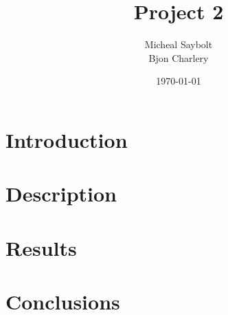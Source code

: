 \documentclass[12pt]{article}
\begin{document}
	\title{Project 2}
	\author{Micheal Saybolt \\ Bjon Charlery}
	
	\date{\today}
	\maketitle
	\pagebreak
	\begin{abstract}
		
	\end{abstract}
	\bigskip
	\bigskip
	\section{Introduction}
	
	\bigskip
	\bigskip
	\section{Description}
	
	\bigskip
	\bigskip
	\section{Results}
	
	\bigskip
	\bigskip
	\section{Conclusions}
	
\end{document}
